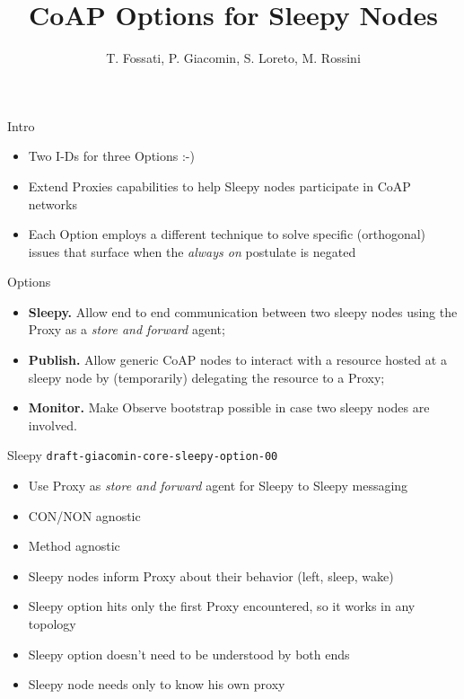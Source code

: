\documentclass{beamer}
\author{{\scriptsize T. Fossati, P. Giacomin, S. Loreto, M. Rossini}}
\title{CoAP Options for Sleepy Nodes}
\institute{{\large IETF 83, Paris}}
\date{}
\begin{document}
\begin{frame}[plain]
 \titlepage
\end{frame}

\begin{frame}{Intro}

\begin{itemize}
 \item Two I-Ds for three Options :-)
 \item Extend Proxies capabilities to help Sleepy nodes participate in CoAP networks
 \item Each Option employs a different technique to solve specific (orthogonal) issues that surface when the \emph{always on} postulate is negated
\end{itemize}

\end{frame}

\begin{frame}{Options}

\begin{itemize}
 \item \textbf{Sleepy.}  Allow end to end communication between two sleepy nodes using the Proxy as a \emph{store and forward} agent;
 \vspace{.3cm}
 \item \textbf{Publish.}  Allow generic CoAP nodes to interact with a resource hosted at a sleepy node by (temporarily) delegating the resource to a Proxy;
 \vspace{.3cm}
 \item \textbf{Monitor.}  Make Observe bootstrap possible in case two sleepy nodes are involved.
\end{itemize}

\end{frame}


\begin{frame}{Sleepy  \hspace{6cm} {\tiny \texttt{draft-giacomin-core-sleepy-option-00}}}

\begin{itemize}
 \item Use Proxy as \emph{store and forward} agent for Sleepy to Sleepy messaging
 \item CON/NON agnostic
 \item Method agnostic
 \item Sleepy nodes inform Proxy about their behavior (left, sleep, wake)
 \item Sleepy option hits only the first Proxy encountered, so it works in any topology
 \item Sleepy option doesn't need to be understood by both ends
 \item Sleepy node needs only to know his own proxy
\end{itemize}

\end{frame}
\end{document}
